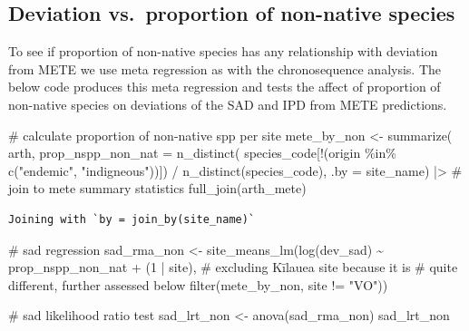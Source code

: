 \documentclass[
  letterpaper,
  DIV=11,
  numbers=noendperiod]{scrartcl}
\newenvironment{Shaded}{\begin{snugshade}}{\end{snugshade}}
\newcommand{\AttributeTok}[1]{\textcolor[rgb]{0.40,0.45,0.13}{#1}}
\newcommand{\CommentTok}[1]{\textcolor[rgb]{0.37,0.37,0.37}{#1}}
\newcommand{\DecValTok}[1]{\textcolor[rgb]{0.68,0.00,0.00}{#1}}
\newcommand{\FunctionTok}[1]{\textcolor[rgb]{0.28,0.35,0.67}{#1}}
\newcommand{\NormalTok}[1]{\textcolor[rgb]{0.00,0.23,0.31}{#1}}
\newcommand{\OtherTok}[1]{\textcolor[rgb]{0.00,0.23,0.31}{#1}}
\newcommand{\SpecialCharTok}[1]{\textcolor[rgb]{0.37,0.37,0.37}{#1}}
\newcommand{\StringTok}[1]{\textcolor[rgb]{0.13,0.47,0.30}{#1}}
\begin{document}
\subsection{Deviation vs.~proportion of non-native
species}\label{deviation-vs.-proportion-of-non-native-species}

To see if proportion of non-native species has any relationship with
deviation from METE we use meta regression as with the chronosequence
analysis. The below code produces this meta regression and tests the
affect of proportion of non-native species on deviations of the SAD and
IPD from METE predictions.

\begin{Shaded}
\begin{Highlighting}[]
\CommentTok{\# calculate proportion of non{-}native spp per site}
\NormalTok{mete\_by\_non }\OtherTok{\textless{}{-}} \FunctionTok{summarize}\NormalTok{(}
\NormalTok{    arth, }
    \AttributeTok{prop\_nspp\_non\_nat =} \FunctionTok{n\_distinct}\NormalTok{(}
\NormalTok{        species\_code[}\SpecialCharTok{!}\NormalTok{(origin }\SpecialCharTok{\%in\%} \FunctionTok{c}\NormalTok{(}\StringTok{"endemic"}\NormalTok{, }\StringTok{"indigneous"}\NormalTok{))]) }\SpecialCharTok{/} 
        \FunctionTok{n\_distinct}\NormalTok{(species\_code),}
    \AttributeTok{.by =}\NormalTok{ site\_name) }\SpecialCharTok{|\textgreater{}} 
    \CommentTok{\# join to mete summary statistics}
    \FunctionTok{full\_join}\NormalTok{(arth\_mete)}
\end{Highlighting}
\end{Shaded}

\begin{verbatim}
Joining with `by = join_by(site_name)`
\end{verbatim}

\begin{Shaded}
\begin{Highlighting}[]
\CommentTok{\# sad regression }
\NormalTok{sad\_rma\_non }\OtherTok{\textless{}{-}} \FunctionTok{site\_means\_lm}\NormalTok{(}\FunctionTok{log}\NormalTok{(dev\_sad) }\SpecialCharTok{\textasciitilde{}}\NormalTok{ prop\_nspp\_non\_nat }\SpecialCharTok{+}\NormalTok{ (}\DecValTok{1} \SpecialCharTok{|}\NormalTok{ site), }
                             \CommentTok{\# excluding Kīlauea site because it is }
                             \CommentTok{\# quite different, further assessed below}
                             \FunctionTok{filter}\NormalTok{(mete\_by\_non, site }\SpecialCharTok{!=} \StringTok{"VO"}\NormalTok{))}

\CommentTok{\# sad likelihood ratio test}
\NormalTok{sad\_lrt\_non }\OtherTok{\textless{}{-}} \FunctionTok{anova}\NormalTok{(sad\_rma\_non)}
\NormalTok{sad\_lrt\_non}
\end{Highlighting}
\end{Shaded}
\end{document}
